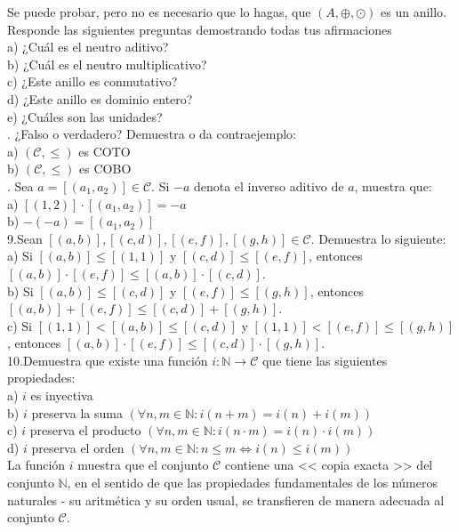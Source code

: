 \documentclass[letterpaper]{article}
\newcommand{\C}{\mathcal{C}}
\newcommand{\mas}{\oplus}
\newcommand{\por}{\odot}
\newcommand{\N}{\mathds{N}}
\renewcommand{\*}{\cdot}
\theoremstyle{definition}
\begin{document}
Se puede probar, pero no es necesario que lo hagas, que $ (A, \mas, \por) $ es un anillo. Responde las siguientes preguntas demostrando todas tus afirmaciones\\
a) ¿Cuál es el neutro aditivo?\\
b) ¿Cuál es el neutro multiplicativo?\\
c) ¿Este anillo es conmutativo?\\
d) ¿Este anillo es dominio entero?\\
e) ¿Cuáles son las unidades?\\
. ¿Falso o verdadero? Demuestra o da contraejemplo:\\
a) $ (\C, \leq) $ es COTO\\
b) $ (\C, \leq) $ es COBO\\
. Sea $ a = [(a_1, a_2)] \in \C $. Si $ -a $ denota el inverso aditivo de $ a $, muestra que:\\
a) $ [(1,2)] \* [(a_1,a_2)] =  -a$\\
b) $ -(-a) = [(a_1,a_2)]$\\
\noindent9.Sean $ [(a,b)], [(c,d)], [(e,f)], [(g,h)] \in \C $. Demuestra lo siguiente:\\
a) Si $ [(a, b)] \leq [(1,1)] $ y $ [(c,d)] \leq [( e,f)] $, entonces $ [(a,b)] \* [( e,f )] \leq [(a,b)] \* [(c,d)] $.\\
b) Si $ [(a, b)] \leq [(c,d)] $ y $ [(e,f)] \leq [( g,h)] $, entonces $ [(a,b)] + [( e,f )] \leq [(c,d)] + [(g,h)] $.\\
c) Si $ [(1,1)] < [(a, b)] \leq [(c,d)] $ y $ [(1,1)] < [(e,f)] \leq [( g,h)] $, entonces $ [(a,b)] \* [( e,f )] \leq [(c,d)] \* [(g,h)] $.\\

\noindent10.Demuestra que existe una función $ i: \N \rightarrow \C $ que tiene las siguientes propiedades:\\
a) $ i $ es inyectiva\\
b) $ i $ preserva la suma $ \left( \forall n,m \in \N: i(n + m) = i(n) + i(m)  \right) $\\
c) $ i $ preserva el producto $ \left( \forall n,m \in \N: i(n \* m) = i(n) \* i(m)  \right) $\\
d) $ i $ preserva el orden $ \left( \forall n,m \in \N: n \leq m \Longleftrightarrow i(n) \leq i(m)  \right) $\\
La función $ i $ muestra que el conjunto $ \C $ contiene una << copia exacta >> del conjunto $ \N $, en el sentido de que las propiedades fundamentales de los números naturales - su aritmética y su orden usual, se transfieren de manera adecuada al conjunto $ \C $.\\
\end{document}

